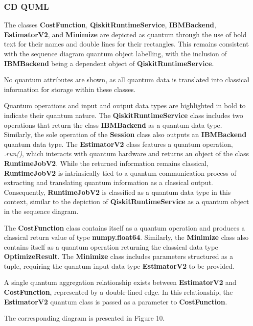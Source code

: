 \documentclass{article}
\begin{document}
\subsubsection{CD QUML}

The classes \textbf{CostFunction}, \textbf{QiskitRuntimeService}, \textbf{IBMBackend}, \textbf{EstimatorV2}, and \textbf{Minimize} are depicted as quantum through the use of bold text for their names and double lines for their rectangles. This remains consistent with the sequence diagram quantum object labelling, with the inclusion of \textbf{IBMBackend} being a dependent object of \textbf{QiskitRuntimeService}.

No quantum attributes are shown, as all quantum data is translated into classical information for storage within these classes.

Quantum operations and input and output data types are highlighted in bold to indicate their quantum nature. The \textbf{QiskitRuntimeService} class includes two operations that return the class \textbf{IBMBackend} as a quantum data type. Similarly, the sole operation of the \textbf{Session} class also outputs an \textbf{IBMBackend} quantum data type. The \textbf{EstimatorV2} class features a quantum operation, \textit{.run()}, which interacts with quantum hardware and returns an object of the class \textbf{RuntimeJobV2}. While the returned information remains classical, \textbf{RuntimeJobV2} is intrinsically tied to a quantum communication process of extracting and translating quantum information as a classical output. Consequently, \textbf{RuntimeJobV2} is classified as a quantum data type in this context, similar to the depiction of \textbf{QiskitRuntimeService} as a quantum object in the sequence diagram. 

The \textbf{CostFunction} class contains itself as a quantum operation and produces a classical return value of type \textbf{numpy.float64}. Similarly, the \textbf{Minimize} class also contains itself as a quantum operation returning the classical data type \textbf{OptimizeResult}. The \textbf{Minimize} class includes parameters structured as a tuple, requiring the quantum input data type \textbf{EstimatorV2} to be provided.

A single quantum aggregation relationship exists between \textbf{EstimatorV2} and \textbf{CostFunction}, represented by a double-lined edge. In this relationship, the \textbf{EstimatorV2} quantum class is passed as a parameter to \textbf{CostFunction}.

The corresponding diagram is presented in Figure 10.
\end{document}
